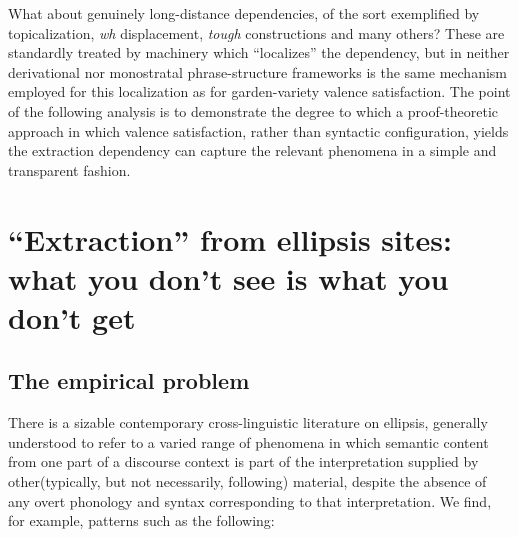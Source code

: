 \documentclass[output=paper,colorlinks,citecolor=brown]{langscibook}
\begin{document}
What about genuinely long-distance dependencies, of the sort
exemplified by topicalization, \textit{wh} displacement, \textit{tough}
constructions and many others? These are standardly treated by
machinery which ``localizes'' the dependency, but in neither
derivational nor monostratal phrase-structure frameworks is the same
mechanism employed for this localization as for garden-variety valence
satisfaction. The point of the following analysis is to demonstrate
the degree to which a proof-theoretic approach in which valence satisfaction,
rather than syntactic configuration, yields the extraction dependency
can capture the relevant phenomena in a simple and transparent fashion.

\section{``Extraction'' from ellipsis sites: what you don't see is what you don't get}
\label{sec-extraction}

\subsection{The empirical problem}

There is a sizable contemporary cross-linguistic literature on
ellipsis, generally understood to refer to a varied range of phenomena
in which semantic content from one part of a discourse context is
part of the interpretation supplied by other(typically, but
not necessarily, following)  material, despite the absence of any
overt phonology and syntax corresponding to that interpretation. We
find, for example, patterns such as the following:
\end{document}
